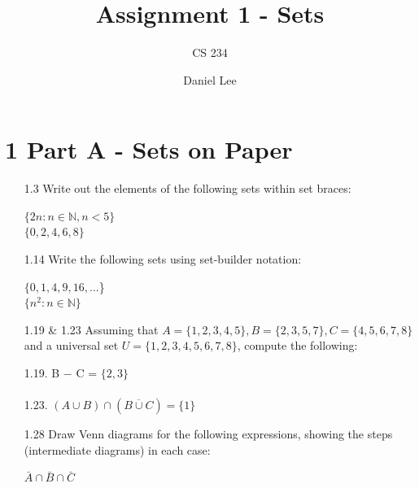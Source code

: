 \documentclass[10pt]{article}
\title{Assignment 1 - Sets }
\author{CS 234}
\date{Daniel Lee}
\begin{document}
\maketitle

\section*{1 \quad Part A - Sets on Paper}

\begin{enumerate}
      \item [1.3] Write out the elements of the following sets within set braces:


            $\{2 n: n \in \mathbb{N}, n<5\}$
            \\ $\{0, 2, 4, 6, 8\}$

      \item [1.14] Write the following sets using set-builder notation:

            $\{0, 1, 4, 9, 16,...$\}
            \\ $\{n^2: n \in \mathbb{N}\}$

      \item [1.19 \& 1.23] Assuming that $A=\{1,2,3,4,5\}, B=\{2,3,5,7\}, C=\{4,5,6,7,8\}$ and a universal set $U=\{1,2,3,4,5,6,7,8\}$, compute the following:


            1.19. B $-$ C = $\{2, 3\}$
            \\
            \\ 1.23. $(A \cup B) \cap(\overline{B \cup C})=\{1\}$

      \item [1.28] Draw Venn diagrams for the following expressions, showing the steps (intermediate diagrams) in each case:

            $\bar{A} \cap \bar{B} \cap \bar{C}$



\end{enumerate}
\end{document}
